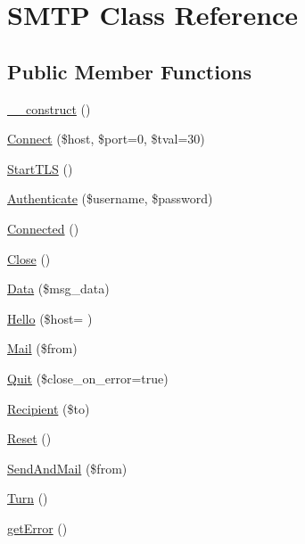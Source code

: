 \hypertarget{class_s_m_t_p}{}\section{S\+M\+T\+P Class Reference}
\label{class_s_m_t_p}
\subsection*{Public Member Functions}
\begin{DoxyCompactItemize}
\item 
\hyperlink{class_s_m_t_p_a095c5d389db211932136b53f25f39685}{\+\_\+\+\_\+construct} ()
\item 
\hyperlink{class_s_m_t_p_a85df13601afd240525e0869fd75094a4}{Connect} (\$host, \$port=0, \$tval=30)
\item 
\hyperlink{class_s_m_t_p_aff764c8fd83e2ab2c8b179b751cac879}{Start\+T\+L\+S} ()
\item 
\hyperlink{class_s_m_t_p_af59f906f714cbbc55b7c746b0fe60405}{Authenticate} (\$username, \$password)
\item 
\hyperlink{class_s_m_t_p_a0358c0888653531baa59999f02ffccd6}{Connected} ()
\item 
\hyperlink{class_s_m_t_p_a2fd4e06444aa4ace4cab6d6950ba2bb2}{Close} ()
\item 
\hyperlink{class_s_m_t_p_ad9afce78561c69a37677a952ac9bb23b}{Data} (\$msg\+\_\+data)
\item 
\hyperlink{class_s_m_t_p_a9c7137e431d9c50581a0f995d590aeeb}{Hello} (\$host= \textquotesingle{}\textquotesingle{})
\item 
\hyperlink{class_s_m_t_p_a8225ef955973dd655d3dda2b0231c048}{Mail} (\$from)
\item 
\hyperlink{class_s_m_t_p_a00fe8d621ef43f18ce8488f85ab0c7a1}{Quit} (\$close\+\_\+on\+\_\+error=true)
\item 
\hyperlink{class_s_m_t_p_a8f6a8a4f94f8b4158a3b9ec1b6941857}{Recipient} (\$to)
\item 
\hyperlink{class_s_m_t_p_add81a2b50ba43e8c6f3e6aa6295dda99}{Reset} ()
\item 
\hyperlink{class_s_m_t_p_a918869b3c5640934f06b2572ea2f7c1f}{Send\+And\+Mail} (\$from)
\item 
\hyperlink{class_s_m_t_p_a06e7ca64617dba9f9847f110c979be19}{Turn} ()
\item 
\hyperlink{class_s_m_t_p_a24ada5decce3d1b79cd82f5a90ccf404}{get\+Error} ()
\end{DoxyCompactItemize}

